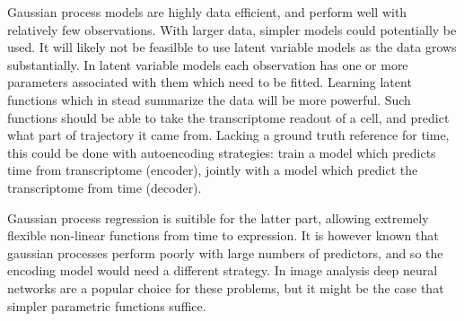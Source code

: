 Gaussian process models are highly data efficient, and perform well with relatively few observations. With larger data, simpler models could potentially be used. It will likely not be feasilble to use latent variable models as the data grows substantially. In latent variable models each observation has one or more parameters associated with them which need to be fitted. Learning latent functions which in stead summarize the data will be more powerful. Such functions should be able to take the transcriptome readout of a cell, and predict what part of trajectory it came from. Lacking a ground truth reference for time, this could be done with autoencoding strategies: train a model which predicts time from transcriptome (encoder), jointly with a model which predict the transcriptome from time (decoder).

Gaussian process regression is suitible for the latter part, allowing extremely flexible non-linear functions from time to expression. It is however known that gaussian processes perform poorly with large numbers of predictors, and so the encoding model would need a different strategy. In image analysis deep neural networks are a popular choice for these problems, but it might be the case that simpler parametric functions suffice.
